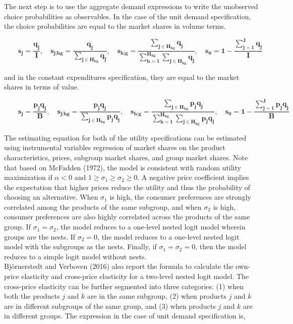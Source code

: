 \documentclass[a4paper,11pt]{article}
\begin{document}
    The next step is to use the aggregate demand expressions to write the unobserved choice probabilities as observables. In the case of the unit demand specification, the choice probabilities are equal to the market shares in volume terms.

    \begin{equation*}
        \qquad \mathbf{s_{j} = \dfrac{q_{j}}{I}, \quad 
        s_{j|hg} = \dfrac{q_{j}}{\sum_{j \in H_{hg}} q_{j}}, \quad 
        s_{h|g} = \dfrac{\sum_{j \in H_{hg}} q_{j}}{\sum_{h = 1}^{H_{hg}}\sum_{j \in H_{hg}} q_{j}}, \quad 
        s_{0} = 1 - \dfrac{\sum_{j = 1}^{J} q_{j}}{I}} 
    \end{equation*}

    and in the constant expenditures specification, they are equal to the market shares in terms of value.
    
    \begin{equation*}
        \qquad \mathbf{s_{j} = \dfrac{p_{j}q_{j}}{B}, \quad 
        s_{j|hg} = \dfrac{p_{j}q_{j}}{\sum_{j \in H_{hg}} p_{j}q_{j}}, \quad 
        s_{h|g} = \dfrac{\sum_{j \in H_{hg}} p_{j}q_{j}}{\sum_{h = 1}^{H_{hg}}\sum_{j \in H_{hg}} p_{j}q_{j}}, \quad 
        s_{0} = 1 - \dfrac{\sum_{j = 1}^{J} p_{j}q_{j}}{B}} 
    \end{equation*}

    \newpage
    The estimating equation for both of the utility specifications can be estimated using instrumental variables regression of market shares on the product characteristics, prices, subgroup market shares, and group market shares. Note that based on McFadden (1972), the model is consistent with random utility maximization if $\alpha < 0$ and $1 \geq \sigma_{1} \geq \sigma_{2} \geq 0$. A negative price coefficient implies the expectation that higher prices reduce the utility and thus the probability of choosing an alternative. When $\sigma_{1}$ is high, the consumer preferences are strongly correlated among the products of the same subgroup, and when $\sigma_{2}$ is high, consumer preferences are also highly correlated across the products of the same group. If $\sigma_{1}=\sigma_{2}$, the model reduces to a one-level nested logit model wherein groups are the nests. If $\sigma_{2} = 0$, the model reduces to a one-level nested logit model with the subgroups as the nests. Finally, if $\sigma_{1} = \sigma_{2} = 0$, then the model reduces to a simple logit model without nests.\\ 

    Björnerstedt and Verboven (2016) \cite{Björnerstedt&Verboven2016} also report the formula to calculate the own-price elasticity and cross-price elasticity for a two-level nested logit model. The cross-price elasticity can be further segmented into three categories: (1) when both the products $j$ and $k$ are in the same subgroup, (2) when products $j$ and $k$ are in different subgroups of the same group, and (3) when products $j$ and $k$ are in different groups. The expression in the case of unit demand specification is,
\end{document}
